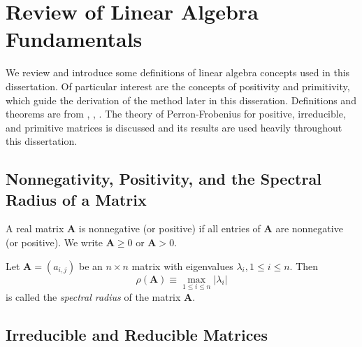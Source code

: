 
\section{Review of Linear Algebra Fundamentals}

We review and introduce some definitions of linear algebra concepts used in this dissertation. Of particular interest are the concepts of positivity and primitivity, which guide the derivation of the method later in this disseration. Definitions and theorems are from \cite{horn_matrix_2012}, \cite{birkhoff_mathematical_1961}, \cite{varga_matrix_2009}. The theory of Perron-Frobenius for positive, irreducible, and primitive matrices is discussed and its results are used heavily throughout this dissertation.

\subsection{Nonnegativity, Positivity, and the Spectral Radius of a Matrix}

\begin{definition}
A real matrix $\mathbf{A}$ is nonnegative (or positive) if all entries of $\mathbf{A}$ are nonnegative (or positive). We write  $\mathbf{A} \ge 0$ or $\mathbf{A} > 0$.
\end{definition}

\begin{definition}
Let $\mathbf{A} = (a_{i,j})$ be an $n \times n$ matrix with eigenvalues $\lambda_{i}, 1 \le i \le n$. Then
	\begin{equation*}
		\rho(\mathbf{A}) \equiv \max_{1 \le i \le n} |\lambda_{i}|
	\end{equation*}
is called the \textit{spectral radius} of the matrix $\mathbf{A}$.
\end{definition}
		
\subsection{Irreducible and Reducible Matrices}
				
